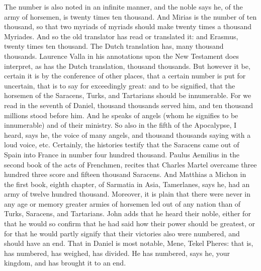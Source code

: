 The number is also noted in an infinite manner, and the noble says he, of the army of horsemen, is twenty times ten thousand. And Mirias is the number of ten thousand, so that two myriads of myriads should make twenty times a thousand Myriades. And so the old translator has read or translated it: and Erasmus, twenty times ten thousand. The Dutch translation has, many thousand thousands. Laurence Valla in his annotations upon the New Testament does interpret, as has the Dutch translation, thousand thousands. But however it be, certain it is by the conference of other places, that a certain number is put for uncertain, that is to say for exceedingly great: and to be signified, that the horsemen of the Saracens, Turks, and Tartarians should be innumerable. For we read in the seventh of Daniel, thousand thousands served him, and ten thousand millions stood before him. And he speaks of angels (whom he signifies to be innumerable) and of their ministry. So also in the fifth of the Apocalypse, I heard, says he, the voice of many angels, and thousand thousands saying with a loud voice, etc. Certainly, the histories testify that the Saracens came out of Spain into France in number four hundred thousand. Paulus Aemilius in the second book of the acts of Frenchmen, recites that Charles Martel overcame three hundred three score and fifteen thousand Saracens. And Matthias a Michon in the first book, eighth chapter, of Sarmatia in Asia, Tamerlanes, says he, had an army of twelve hundred thousand. Moreover, it is plain that there were never in any age or memory greater armies of horsemen led out of any nation than of Turks, Saracens, and Tartarians. John adds that he heard their noble, either for that he would so confirm that he had said how their power should be greatest, or for that he would partly signify that their victories also were numbered, and should have an end. That in Daniel is most notable, Mene, Tekel Pheres: that is, has numbered, has weighed, has divided. He has numbered, says he, your kingdom, and has brought it to an end.

